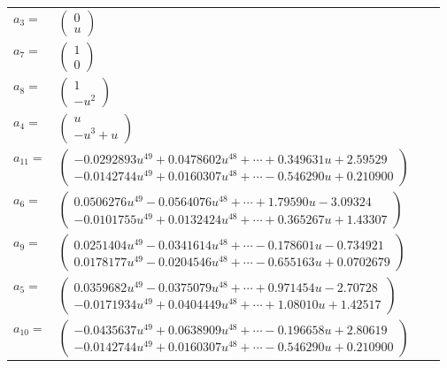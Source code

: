 \documentclass[1p]{elsarticle_modified}
\theoremstyle{definition}
\begin{document}
\begin{tabular}{m{7pt} m{180pt} m{7pt} m{180pt} }
\flushright $a_{3}=$&$\begin{pmatrix}0\\u\end{pmatrix}$ \\
\flushright $a_{7}=$&$\begin{pmatrix}1\\0\end{pmatrix}$ \\
\flushright $a_{8}=$&$\begin{pmatrix}1\\- u^2\end{pmatrix}$ \\
\flushright $a_{4}=$&$\begin{pmatrix}u\\- u^3+u\end{pmatrix}$ \\
\flushright $a_{11}=$&$\begin{pmatrix}-0.0292893 u^{49}+0.0478602 u^{48}+\cdots+0.349631 u+2.59529\\-0.0142744 u^{49}+0.0160307 u^{48}+\cdots-0.546290 u+0.210900\end{pmatrix}$ \\
\flushright $a_{6}=$&$\begin{pmatrix}0.0506276 u^{49}-0.0564076 u^{48}+\cdots+1.79590 u-3.09324\\-0.0101755 u^{49}+0.0132424 u^{48}+\cdots+0.365267 u+1.43307\end{pmatrix}$ \\
\flushright $a_{9}=$&$\begin{pmatrix}0.0251404 u^{49}-0.0341614 u^{48}+\cdots-0.178601 u-0.734921\\0.0178177 u^{49}-0.0204546 u^{48}+\cdots-0.655163 u+0.0702679\end{pmatrix}$ \\
\flushright $a_{5}=$&$\begin{pmatrix}0.0359682 u^{49}-0.0375079 u^{48}+\cdots+0.971454 u-2.70728\\-0.0171934 u^{49}+0.0404449 u^{48}+\cdots+1.08010 u+1.42517\end{pmatrix}$ \\
\flushright $a_{10}=$&$\begin{pmatrix}-0.0435637 u^{49}+0.0638909 u^{48}+\cdots-0.196658 u+2.80619\\-0.0142744 u^{49}+0.0160307 u^{48}+\cdots-0.546290 u+0.210900\end{pmatrix}$ \\

\end{tabular}
\end{document}
